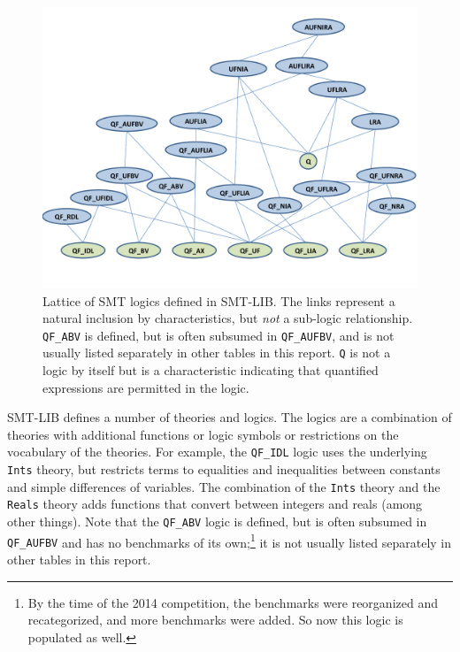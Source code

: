 \documentclass[smallcondensed]{svjour3}
\begin{document}
\begin{figure}
\centering
\includegraphics[width=\textwidth]{LogicLattice}
\caption{Lattice of SMT logics defined in SMT-LIB. The links represent a natural inclusion by characteristics, but {\it not} a sub-logic relationship. {\tt QF\_ABV} is defined, but is often subsumed in {\tt QF\_AUFBV}, and is not usually listed separately in other tables in this report. {\tt Q} is not a logic by itself but is a characteristic indicating that quantified expressions are permitted in the logic.}
\label{Fig:lattice}
\end{figure}

SMT-LIB defines a number of theories and logics. The logics are a combination of theories with additional functions or logic symbols or restrictions on the vocabulary of the theories. For example, the {\tt QF\_IDL} logic uses the underlying {\tt Ints} theory, but restricts terms to equalities and inequalities between constants and simple differences of variables.
The combination of the {\tt Ints} theory and the {\tt Reals} theory adds functions that convert between integers and reals (among other things). 
Note that the {\tt QF\_ABV} logic is defined, but is often subsumed in {\tt QF\_AUFBV} and has no benchmarks of its own;\footnote{By the time of the 2014 competition, the benchmarks were reorganized and recategorized, and more benchmarks were added. So now this logic is populated as well.} it is not usually listed separately in other tables in this report.
\end{document}
